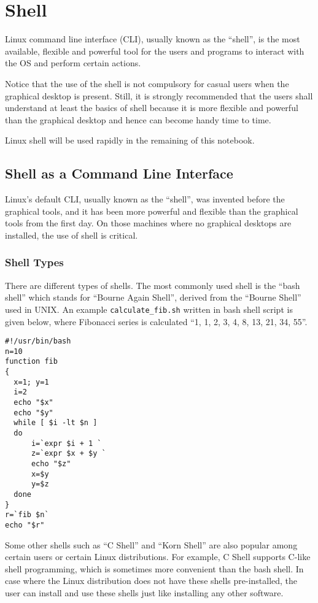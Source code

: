 \chapter{Shell} \label{ch:sb}

Linux command line interface (CLI), usually known as the ``shell'', is the most available, flexible and powerful tool for the users and programs to interact with the OS and perform certain actions.

Notice that the use of the shell is not compulsory for casual users when the graphical desktop is present. Still, it is strongly recommended that the users shall understand at least the basics of shell because it is more flexible and powerful than the graphical desktop and hence can become handy time to time.

Linux shell will be used rapidly in the remaining of this notebook.

\section{Shell as a Command Line Interface}

Linux's default CLI, usually known as the ``shell'', was invented before the graphical tools, and it has been more powerful and flexible than the graphical tools from the first day. On those machines where no graphical desktops are installed, the use of shell is critical.

\subsection{Shell Types}

There are different types of shells. The most commonly used shell is the ``bash shell'' which stands for ``Bourne Again Shell'', derived from the ``Bourne Shell'' used in UNIX. An example \verb|calculate_fib.sh| written in bash shell script is given below, where Fibonacci series is calculated ``1, 1, 2, 3, 4, 8, 13, 21, 34, 55''.

\begin{lstlisting}
#!/usr/bin/bash
n=10
function fib
{
  x=1; y=1
  i=2
  echo "$x"
  echo "$y"
  while [ $i -lt $n ]
  do
      i=`expr $i + 1 `
      z=`expr $x + $y `
      echo "$z"
      x=$y
      y=$z
  done
}
r=`fib $n`
echo "$r"
\end{lstlisting}

Some other shells such as ``C Shell'' and ``Korn Shell'' are also popular among certain users or certain Linux distributions. For example, C Shell supports C-like shell programming, which is sometimes more convenient than the bash shell. In case where the Linux distribution does not have these shells pre-installed, the user can install and use these shells just like installing any other software.

